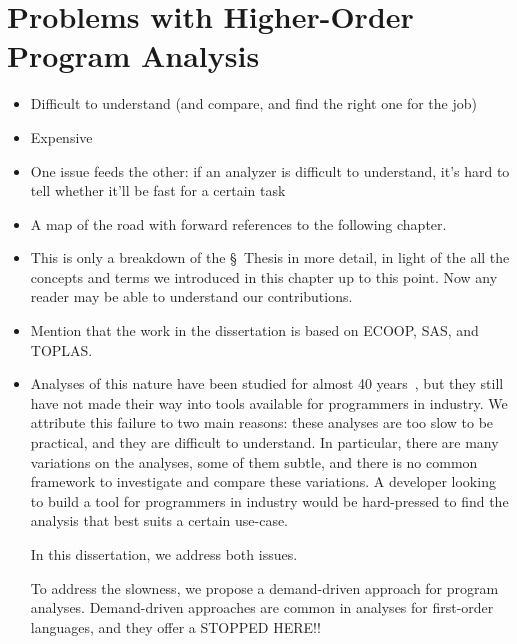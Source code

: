 \documentclass[12pt, oneside]{book}
\begin{document}
\section{Problems with Higher-Order Program Analysis}
\label{section:problems-with-higher-order-program-analysis}

\begin{itemize}
  \item Difficult to understand (and compare, and find the right one for the job)
  \item Expensive
  \item One issue feeds the other: if an analyzer is difficult to understand, it’s hard to tell whether it’ll be fast for a certain task
\end{itemize}

\begin{itemize}
  \item A map of the road with forward references to the following chapter.
  \item This is only a breakdown of the §~Thesis in more detail, in light of the all the concepts and terms we introduced in this chapter up to this point. Now any reader may be able to understand our contributions.
  \item Mention that the work in the dissertation is based on ECOOP, SAS, and TOPLAS.
  \item Analyses of this nature have been studied for almost 40 years~\cite{jones-81}, but they still have not made their way into tools available for programmers in industry. We attribute this failure to two main reasons: these analyses are too slow to be practical, and they are difficult to understand. In particular, there are many variations on the analyses, some of them subtle, and there is no common framework to investigate and compare these variations. A developer looking to build a tool for programmers in industry would be hard-pressed to find the analysis that best suits a certain use-case.

  In this dissertation, we address both issues.
  
  To address the slowness, we propose a demand-driven approach for program analyses. Demand-driven approaches are common in analyses for first-order languages, and they offer a STOPPED HERE!!
  

\end{itemize}
\end{document}
